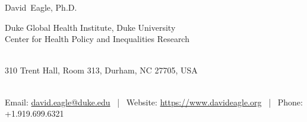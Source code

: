 \documentclass[11pt, letter]{article}
\makeatletter
\newcommand{\FirstName}{David}
\newcommand{\LastName}{Eagle}
\newcommand{\Degree}{Ph.D.}
\newcommand{\MyName}{\FirstName\ \LastName, \Degree}
\newcommand{\MyRole}{Assistant Research Professor}
\newcommand{\Email}{david.eagle@duke.edu}
\newcommand{\Website}{https://www.davideagle.org}
\newcommand{\Phone}{+1.919.699.6321}
\newcommand{\Affiliation}{
Duke Global Health Institute, Duke University\\
Center for Health Policy and Inequalities Research
}
\newcommand{\Address}{
    310 Trent Hall, Room 313, Durham, NC 27705, USA
}
\newcommand{\makefield}[2]{\makebox[1.5em]{\color{MarkerColour!80!black}#1} #2}
\makeatother
\begin{document}
\thispagestyle{empty}

\begin{center}
    {\fontsize{24pt}{0}\selectfont \MyName}
    \\[0.3cm]
    {\fontsize{10pt}{0}\selectfont
        \Affiliation
        \\[0.2cm]
        \Address
        \\[0.08cm]
        Email: \href{mailto:\Email}{\texttt\small{\Email}}
        \, | \,
        Website: \url{\Website}
        \, | \,
        Phone: \Phone
    }
\end{center}









%
\end{document}
